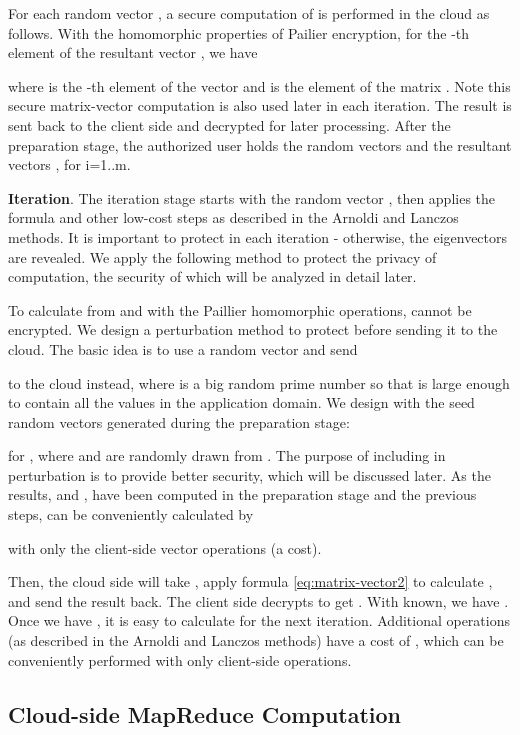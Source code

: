 \documentclass[10pt, conference, compsocconf]{IEEEtran}
\begin{document}
For each random vector , a secure computation of  is performed in the cloud as follows. With the homomorphic properties of Pailier encryption, for the -th element of the resultant vector , we have

where  is the -th element of the vector  and  is the element  of the matrix . 
Note this secure matrix-vector computation is also used later in each iteration. The result  is sent back to the client side and decrypted for later processing. 
After the preparation stage, the authorized user holds the random vectors  and the resultant vectors , for i=1..m.


\textbf{Iteration}. The iteration stage starts with the random vector , then applies the formula  and other low-cost steps as described in the Arnoldi and Lanczos methods. It is important to protect  in each iteration - otherwise, the eigenvectors are revealed. 
We apply the following method to protect the privacy of computation, the security of which will be analyzed in detail later.

To calculate  from  and  with the Paillier homomorphic operations,  cannot be encrypted. We design a perturbation method to protect  before sending it to the cloud. The basic idea is to use a random vector  and send 

to the cloud instead, where  is a big random prime number so that  is large enough to contain all the values in the application domain. We design  with the seed random vectors generated during the preparation stage:

for , where  and  are randomly drawn from . The purpose of including  in perturbation is to provide better security, which will be discussed later. As the results,  and , have been computed in the preparation stage and the previous steps,  can be conveniently calculated by

with only the client-side vector operations (a  cost). 

Then, the cloud side will take , apply formula \ref{eq:matrix-vector2} to calculate , and send the result back. The client side decrypts  to get . With  known, we have . Once we have , it is easy to calculate  for the next iteration. Additional operations (as described in the Arnoldi and Lanczos methods) have a cost of , which can be conveniently performed with only client-side operations. 


\subsection{Cloud-side MapReduce Computation}
\end{document}
